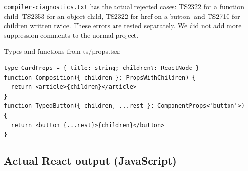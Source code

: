 \documentclass[
  10pt,
  a4paper,
]{article}
\begin{document}
\texttt{compiler-diagnostics.\allowbreak{}txt} has the actual rejected
cases: TS2322 for a function child, TS2353 for an object child, TS2322
for href on a button, and TS2710 for children written twice. These
errors are tested separately. We did not add more suppression comments
to the normal project.


Types and functions from ts/props.tsx:

\begin{minipage}{\linewidth}

\begin{lstlisting}
type CardProps = { title: string; children?: ReactNode }
function Composition({ children }: PropsWithChildren) {
  return <article>{children}</article>
}
function TypedButton({ children, ...rest }: ComponentProps<'button'>) {
  return <button {...rest}>{children}</button>
}
\end{lstlisting}

\end{minipage}\par

\subsection{Actual React output
(JavaScript)}\label{actual-react-output-javascript}
\end{document}
